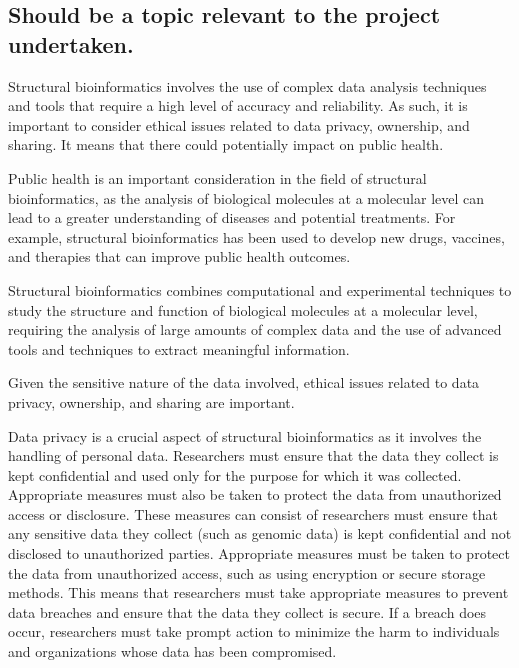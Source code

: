 \documentclass[]{final_report}
\begin{document}
\subsection{Should be a topic relevant to the project undertaken.}
Structural bioinformatics involves the use of complex data analysis techniques and tools that require a high level of accuracy and reliability. As such, it is important to consider ethical issues related to data privacy, ownership, and sharing. It means that there could potentially impact on public health.

Public health is an important consideration in the field of structural bioinformatics, as the analysis of biological molecules at a molecular level can lead to a greater understanding of diseases and potential treatments. For example, structural bioinformatics has been used to develop new drugs, vaccines, and therapies that can improve public health outcomes.

Structural bioinformatics combines computational and experimental techniques to study the structure and function of biological molecules at a molecular level, requiring the analysis of large amounts of complex data and the use of advanced tools and techniques to extract meaningful information.

Given the sensitive nature of the data involved, ethical issues related to data privacy, ownership, and sharing are important. 

Data privacy is a crucial aspect of structural bioinformatics as it involves the handling of personal data. Researchers must ensure that the data they collect is kept confidential and used only for the purpose for which it was collected. Appropriate measures must also be taken to protect the data from unauthorized access or disclosure. These measures can consist of researchers must ensure that any sensitive data they collect (such as genomic data) is kept confidential and not disclosed to unauthorized parties. Appropriate measures must be taken to protect the data from unauthorized access, such as using encryption or secure storage methods. This means that researchers must take appropriate measures to prevent data breaches and ensure that the data they collect is secure. If a breach does occur, researchers must take prompt action to minimize the harm to individuals and organizations whose data has been compromised.
\end{document}
